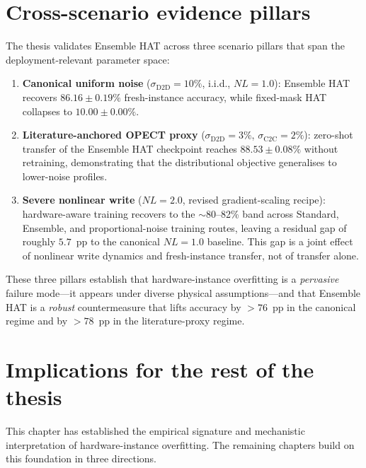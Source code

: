 \section{Cross-scenario evidence pillars}
\label{sec:ch1-three-pillars}

The thesis validates Ensemble HAT across three scenario pillars that span the deployment-relevant parameter space:

\begin{enumerate}
    \item \textbf{Canonical uniform noise} ($\sigma_{\mathrm{D2D}}=10\%$, i.i.d., $NL=1.0$): Ensemble HAT recovers $86.16\pm0.19\%$ fresh-instance accuracy, while fixed-mask HAT collapses to $10.00\pm0.00\%$.
    
    \item \textbf{Literature-anchored OPECT proxy} ($\sigma_{\mathrm{D2D}}=3\%$, $\sigma_{\mathrm{C2C}}=2\%$): zero-shot transfer of the Ensemble HAT checkpoint reaches $88.53\pm0.08\%$ without retraining, demonstrating that the distributional objective generalises to lower-noise profiles.
    
    \item \textbf{Severe nonlinear write} ($NL=2.0$, revised gradient-scaling recipe): hardware-aware training recovers to the $\sim$80--82\% band across Standard, Ensemble, and proportional-noise training routes, leaving a residual gap of roughly $5.7$~pp to the canonical $NL=1.0$ baseline.  This gap is a joint effect of nonlinear write dynamics and fresh-instance transfer, not of transfer alone.
\end{enumerate}

These three pillars establish that hardware-instance overfitting is a \emph{pervasive} failure mode---it appears under diverse physical assumptions---and that Ensemble HAT is a \emph{robust} countermeasure that lifts accuracy by $>76$~pp in the canonical regime and by $>78$~pp in the literature-proxy regime.


\section{Implications for the rest of the thesis}
\label{sec:ch1-implications}

This chapter has established the empirical signature and mechanistic interpretation of hardware-instance overfitting.  The remaining chapters build on this foundation in three directions.

